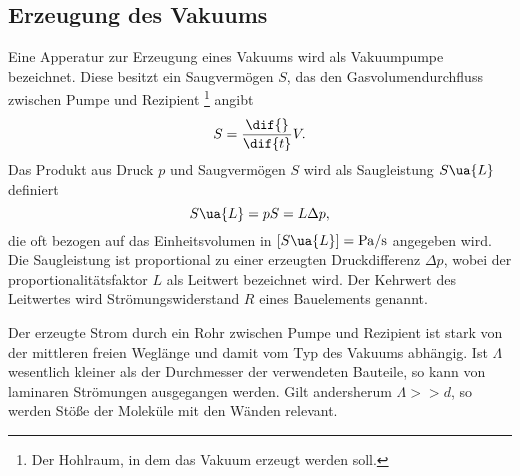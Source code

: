 \subsection{Erzeugung des Vakuums}
Eine Apperatur zur Erzeugung eines Vakuums wird als Vakuumpumpe bezeichnet. Diese besitzt ein
Saugvermögen $S$, das den Gasvolumendurchfluss zwischen Pumpe und Rezipient \footnote{Der Hohlraum, in dem das Vakuum erzeugt werden soll.}
angibt
\begin{equation}
  S = \frac{\dif{}}{\dif{t}} V.
\end{equation}
Das Produkt aus Druck $p$ und Saugvermögen $S$ wird als Saugleistung $S\ua{L}$ definiert
\begin{equation}
  S\ua{L} = p S = L \Delta p ,
\end{equation}
die oft bezogen auf das Einheitsvolumen in $[S\ua{L}] = \si{\pascal \per \second}$ angegeben wird.
Die Saugleistung ist proportional zu einer erzeugten Druckdifferenz $\Delta p$,
wobei der proportionalitätsfaktor $L$ als Leitwert bezeichnet wird. Der Kehrwert des Leitwertes
wird Strömungswiderstand $R$ eines Bauelements genannt.

Der erzeugte Strom durch ein Rohr zwischen Pumpe und Rezipient ist stark von der mittleren freien Weglänge
und damit vom Typ des Vakuums abhängig. Ist $\Lambda$ wesentlich
kleiner als der Durchmesser der verwendeten Bauteile, so kann von laminaren Strömungen ausgegangen werden. Gilt andersherum
$\Lambda >> d$, so werden Stöße der Moleküle mit den Wänden relevant.




